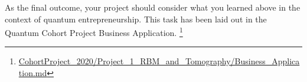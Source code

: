 \documentclass[12pt]{article}
\begin{document}
As the final outcome, your project should consider what you learned above in the context of quantum entrepreneurship.  
This task has been laid out in the Quantum Cohort Project Business Application.
\footnote{\href{https://github.com/CDL-Quantum/CohortProject_2020/blob/master/Project_1_RBM_and_Tomography/Business_Application.md}{CohortProject\_2020/Project\_1\_RBM\_and\_Tomography/Business\_Application.md}}






\end{document}
